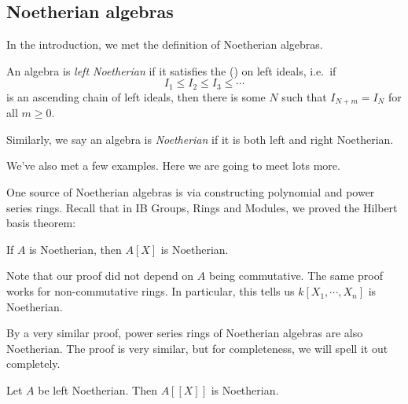 \documentclass[a4paper]{article}
\begin{document}
\subsection{Noetherian algebras}
In the introduction, we met the definition of Noetherian algebras.
\begin{defi}
  An algebra is \emph{left Noetherian} if it satisfies the  () on left ideals, i.e.\ if
  \[
    I_1 \leq I_2 \leq I_3 \leq \cdots
  \]
  is an ascending chain of left ideals, then there is some $N$ such that $I_{N + m} = I_N$ for all $m \geq 0$.

  Similarly, we say an algebra is \emph{Noetherian} if it is both left and right Noetherian.
\end{defi}
We've also met a few examples. Here we are going to meet lots more.

One source of Noetherian algebras is via constructing polynomial and power series rings. Recall that in IB Groups, Rings and Modules, we proved the Hilbert basis theorem:
\begin{thm}
  If $A$ is Noetherian, then $A[X]$ is Noetherian.
\end{thm}
Note that our proof did not depend on $A$ being commutative. The same proof works for non-commutative rings. In particular, this tells us $k[X_1, \cdots, X_n]$ is Noetherian.

By a very similar proof, power series rings of Noetherian algebras are also Noetherian. The proof is very similar, but for completeness, we will spell it out completely.
\begin{thm}
  Let $A$ be left Noetherian. Then $A[[X]]$ is Noetherian.
\end{thm}
\end{document}
